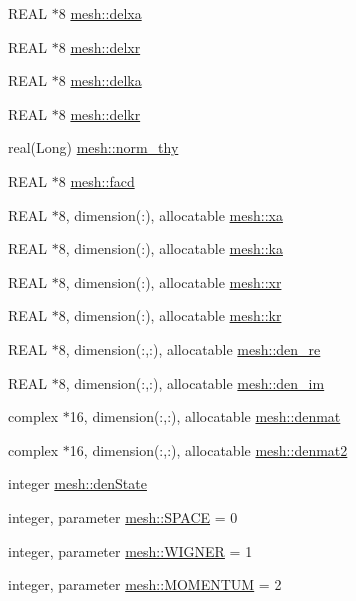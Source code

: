 \begin{DoxyCompactItemize}
\item 
REAL $\ast$8 \hyperlink{namespacemesh_a4bbd964b605a9fedc6fd4b5feaf2d226}{mesh::delxa}
\item 
REAL $\ast$8 \hyperlink{namespacemesh_a8517784a828d82832ad38e911e58cdf1}{mesh::delxr}
\item 
REAL $\ast$8 \hyperlink{namespacemesh_a93c5cfe69a9cda5c977adaf99030481d}{mesh::delka}
\item 
REAL $\ast$8 \hyperlink{namespacemesh_a30ce8cdfbc09510b555134e5ee1c2472}{mesh::delkr}
\item 
real(Long) \hyperlink{namespacemesh_a753aba092294fa8bffbee1fc1b099584}{mesh::norm\_\-thy}
\item 
REAL $\ast$8 \hyperlink{namespacemesh_a43130e9d2b4c80b7862ea7d6226a7a4d}{mesh::facd}
\item 
REAL $\ast$8, dimension(:), allocatable \hyperlink{namespacemesh_af9469b274e48a8fcc34f1c8df7976271}{mesh::xa}
\item 
REAL $\ast$8, dimension(:), allocatable \hyperlink{namespacemesh_acdc9121ee94e3c62c59255106d13fddd}{mesh::ka}
\item 
REAL $\ast$8, dimension(:), allocatable \hyperlink{namespacemesh_a0351493d48c86a4a92f34aa94f8cc099}{mesh::xr}
\item 
REAL $\ast$8, dimension(:), allocatable \hyperlink{namespacemesh_a0eb10f03f0d716aafcb803855dff1b80}{mesh::kr}
\item 
REAL $\ast$8, dimension(:,:), allocatable \hyperlink{namespacemesh_af15f870e8317605924334a07ecfe3b28}{mesh::den\_\-re}
\item 
REAL $\ast$8, dimension(:,:), allocatable \hyperlink{namespacemesh_a88e07a02f831434825843fa4d74b7bc0}{mesh::den\_\-im}
\item 
complex $\ast$16, dimension(:,:), allocatable \hyperlink{namespacemesh_ad78af6f9bdcc56004176e07e81d419f8}{mesh::denmat}
\item 
complex $\ast$16, dimension(:,:), allocatable \hyperlink{namespacemesh_ac1de4684ee911518c05caaa4c6dcf484}{mesh::denmat2}
\item 
integer \hyperlink{namespacemesh_a451ed2546542175ea54b5c9a780b5462}{mesh::denState}
\item 
integer, parameter \hyperlink{namespacemesh_a0c6bae5d6531a6b0f0428c0c056f759d}{mesh::SPACE} = 0
\item 
integer, parameter \hyperlink{namespacemesh_a4e989d120872f8573cf4454bfc6a0d31}{mesh::WIGNER} = 1
\item 
integer, parameter \hyperlink{namespacemesh_a58029be857a15564e9ebaee23b4d887a}{mesh::MOMENTUM} = 2

\end{DoxyCompactItemize}
